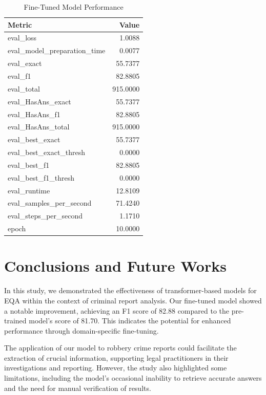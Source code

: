 \documentclass[runningheads]{llncs}
\begin{document}
\begin{table}
  \centering
  \caption{Fine-Tuned Model Performance}
  \label{tab:finetunedModel}
  \scriptsize
  \begin{tabular}{lr}
\toprule
Metric & Value \\
\midrule
eval\_loss & 1.0088 \\
eval\_model\_preparation\_time & 0.0077 \\
eval\_exact & 55.7377 \\
eval\_f1 & 82.8805 \\
eval\_total & 915.0000 \\
eval\_HasAns\_exact & 55.7377 \\
eval\_HasAns\_f1 & 82.8805 \\
eval\_HasAns\_total & 915.0000 \\
eval\_best\_exact & 55.7377 \\
eval\_best\_exact\_thresh & 0.0000 \\
eval\_best\_f1 & 82.8805 \\
eval\_best\_f1\_thresh & 0.0000 \\
eval\_runtime & 12.8109 \\
eval\_samples\_per\_second & 71.4240 \\
eval\_steps\_per\_second & 1.1710 \\
epoch & 10.0000 \\
\bottomrule
\end{tabular}

\end{table}

\section{Conclusions and Future Works}
\label{sec:conclusions}
In this study, we demonstrated the effectiveness of transformer-based
models for EQA within the context of criminal report analysis. Our
fine-tuned model showed a notable improvement, achieving an F1 score
of 82.88 compared to the pre-trained model's score of 81.70. This
indicates the potential for enhanced performance through
domain-specific fine-tuning.

The application of our model to robbery crime reports could facilitate
the extraction of crucial information, supporting legal practitioners
in their investigations and reporting. However, the study also
highlighted some limitations, including the model's occasional
inability to retrieve accurate answers and the need for manual
verification of results. 
\end{document}
